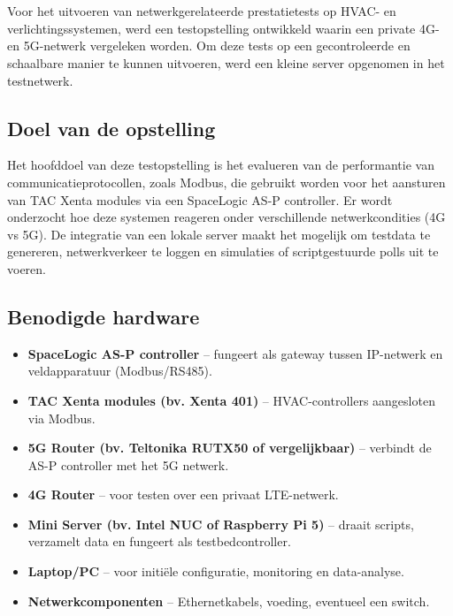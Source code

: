 \chapter{}%
\label{ch:uitgebreide-opstelling}

Voor het uitvoeren van netwerkgerelateerde prestatietests op HVAC- en verlichtingssystemen, werd een testopstelling ontwikkeld waarin een private 4G- en 5G-netwerk vergeleken worden. Om deze tests op een gecontroleerde en schaalbare manier te kunnen uitvoeren, werd een kleine server opgenomen in het testnetwerk.

\section{Doel van de opstelling}

Het hoofddoel van deze testopstelling is het evalueren van de performantie van communicatieprotocollen, zoals Modbus, die gebruikt worden voor het aansturen van TAC Xenta modules via een SpaceLogic AS-P controller. Er wordt onderzocht hoe deze systemen reageren onder verschillende netwerkcondities (4G vs 5G). De integratie van een lokale server maakt het mogelijk om testdata te genereren, netwerkverkeer te loggen en simulaties of scriptgestuurde polls uit te voeren.

\section{Benodigde hardware}

\begin{itemize}
    \item \textbf{SpaceLogic AS-P controller} – fungeert als gateway tussen IP-netwerk en veldapparatuur (Modbus/RS485).
    \item \textbf{TAC Xenta modules (bv. Xenta 401)} – HVAC-controllers aangesloten via Modbus.
    \item \textbf{5G Router (bv. Teltonika RUTX50 of vergelijkbaar)} – verbindt de AS-P controller met het 5G netwerk.
    \item \textbf{4G Router} – voor testen over een privaat LTE-netwerk.
    \item \textbf{Mini Server (bv. Intel NUC of Raspberry Pi 5)} – draait scripts, verzamelt data en fungeert als testbedcontroller.
    \item \textbf{Laptop/PC} – voor initiële configuratie, monitoring en data-analyse.
    \item \textbf{Netwerkcomponenten} – Ethernetkabels, voeding, eventueel een switch.
\end{itemize}

